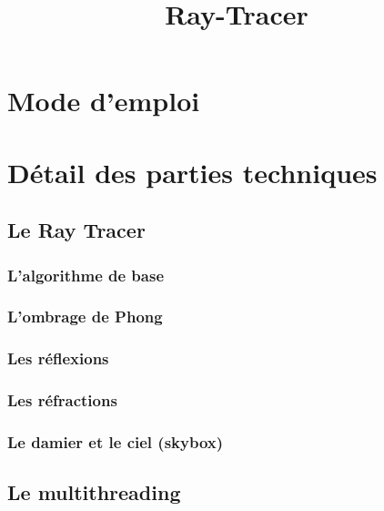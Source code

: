 \documentclass[11pt]{article}
\author{}
\title{Ray-Tracer}
\date{}
\begin{document}
\tableofcontents
\newpage

\maketitle

\section{Mode d'emploi}

\section{Détail des parties techniques}
\subsection{Le Ray Tracer}
\subsubsection{L'algorithme de base}
\label{rayTracingBase}



\subsubsection{L'ombrage de Phong}
\label{ombragePhong}



\subsubsection{Les réflexions}



\subsubsection{Les réfractions}
\label{refractions}

\subsubsection{Le damier et le ciel (skybox)}
\label{checkerboardSkybox}



\subsection{Le multithreading}
\end{document}
